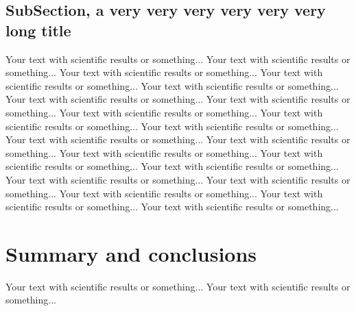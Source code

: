 \documentclass[final]{beamer}
\begin{document}
\begin{frame}[t]
\begin{multicols}{3}
\subsection{SubSection, a very very very very very very long title}

Your text with scientific results or something... 
Your text with scientific results or something... 
Your text with scientific results or something... 
Your text with scientific results or something... 
Your text with scientific results or something... 
Your text with scientific results or something... 
Your text with scientific results or something... 
Your text with scientific results or something... 
Your text with scientific results or something... 
Your text with scientific results or something... 
Your text with scientific results or something... 
Your text with scientific results or something... 
Your text with scientific results or something... 
Your text with scientific results or something... 
Your text with scientific results or something... 
Your text with scientific results or something... 
Your text with scientific results or something... 
Your text with scientific results or something... 
Your text with scientific results or something... 
Your text with scientific results or something...

\section{Summary and conclusions}

Your text with scientific results or something... 
Your text with scientific results or something... 




\end{multicols}
\end{frame}
\end{document}
